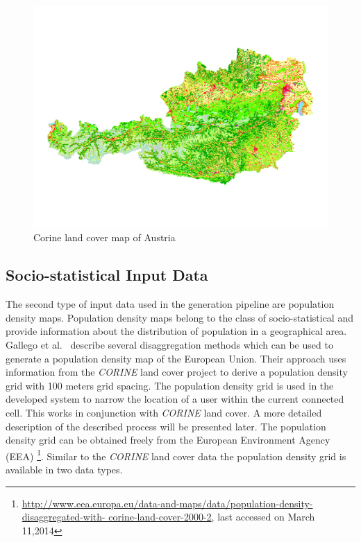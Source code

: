 \documentclass[master,english]{hgbthesis}
\begin{document}
\begin{figure}
	\centering
	\includegraphics[width=\linewidth]{./images/clc_austria.png}
	\caption{Corine land cover map of Austria}
	\label{fig:clc_austria}
\end{figure}
\subsection{Socio-statistical Input Data}
The second type of input data used in the generation pipeline are population density maps. Population density maps belong to the class of socio-statistical and provide information about the distribution of population in a geographical area. Gallego et al.\ \cite{Gallego2010,Gallego2011} describe several disaggregation methods which can be used to generate a population density map of the European Union.
Their approach uses information from the \emph{CORINE} land cover project to derive a population density grid with 100 meters grid spacing. The population density grid is used in the developed system to narrow the location of a user within the current connected cell. This works in conjunction with \emph{CORINE} land cover. A more detailed description of the described process will be presented later.
The population density grid can be obtained freely from the European Environment Agency (EEA) \footnote{\url{http://www.eea.europa.eu/data-and-maps/data/population-density-disaggregated-with-
	corine-land-cover-2000-2}, last accessed on March 11,2014}. Similar to the \emph{CORINE} land cover data the population density grid is available in two data types.
\end{document}
